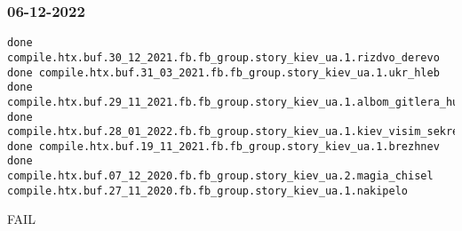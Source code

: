  
 
 
 
 

\subsubsection{06-12-2022}
\label{sec:build.log.06_12_2022}

\begin{Verbatim}
done compile.htx.buf.30_12_2021.fb.fb_group.story_kiev_ua.1.rizdvo_derevo
done compile.htx.buf.31_03_2021.fb.fb_group.story_kiev_ua.1.ukr_hleb
done compile.htx.buf.29_11_2021.fb.fb_group.story_kiev_ua.1.albom_gitlera_hudozhnik_gluschenko
done compile.htx.buf.28_01_2022.fb.fb_group.story_kiev_ua.1.kiev_visim_sekretiv
done compile.htx.buf.19_11_2021.fb.fb_group.story_kiev_ua.1.brezhnev
done compile.htx.buf.07_12_2020.fb.fb_group.story_kiev_ua.2.magia_chisel
compile.htx.buf.27_11_2020.fb.fb_group.story_kiev_ua.1.nakipelo
\end{Verbatim}

FAIL


